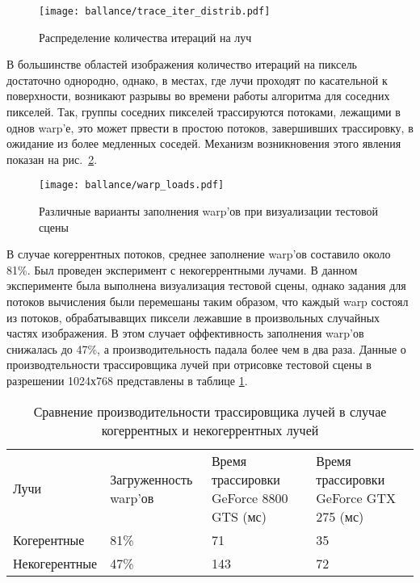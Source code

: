 \begin{figure}[h]
\center
\texttt{[image: ballance/trace\_iter\_distrib.pdf]}
\caption{Распределение количества итераций на луч}
\label{fig:trace_iter_distrib}
\end{figure}

В большинстве областей изображения количество итераций на пиксель достаточно однородно, однако, в местах, где лучи проходят по касательной к поверхности, возникают разрывы во времени работы алгоритма для соседних пикселей. Так, группы соседних пикселей трассируются потоками, лежащими в однов warp'е, это может првести в простою потоков, завершивших трассировку, в ожидание из более медленных соседей. Механизм возникновения этого явления показан на рис.~\ref{fig:warp_loads}.

\begin{figure}[h]
\center
\texttt{[image: ballance/warp\_loads.pdf]}
\caption{Различные варианты заполнения warp'ов при визуализации тестовой сцены}
\label{fig:warp_loads}
\end{figure}

В случае когеррентных потоков, среднее заполнение warp'ов составило около 81\%. Был проведен эксперимент с некогеррентными лучами. В данном эксперименте была выполнена визуализация тестовой сцены, однако задания для потоков вычисления были перемешаны таким образом, что каждый warp состоял из потоков, обрабатывавщих пиксели лежавшие в произвольных случайных частях изображения. В этом случает оффективность заполнения warp'ов снижалась до 47\%, а производительность падала более чем в два раза. Данные о производтельности трассировщика лучей при отрисовке тестовой сцены в разрешении 1024х768 представлены в таблице \ref{tab:coher_perf}.

\begin{table}[ht]
\center
\label{tab:coher_perf}
\begin{tabular}{l|p{}|p{}|p{}}
 Лучи  & Загруженность warp'ов & Время трассировки GeForce 8800 GTS (мс) &  Время трассировки GeForce GTX 275 (мс) \\
\cline{1-4}
  Когерентные  & 81\% & 71 & 35 \\
  Некогерентные & 47\% & 143 &  72 \\
\end{tabular}
\caption{Сравнение производительности трассировщика лучей в случае когеррентных и некогеррентных лучей}
\end{table}


